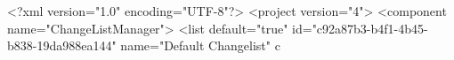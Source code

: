 <?xml version="1.0" encoding="UTF-8"?>
<project version="4">
  <component name="ChangeListManager">
    <list default="true" id="c92a87b3-b4f1-4b45-b838-19da988ea144" name="Default Changelist" c